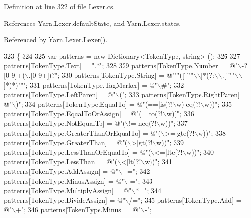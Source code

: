 Definition at line 322 of file Lexer.\-cs.



References Yarn.\-Lexer.\-default\-State, and Yarn.\-Lexer.\-states.



Referenced by Yarn.\-Lexer.\-Lexer().


\begin{DoxyCode}
323         \{
324 
325             var patterns = \textcolor{keyword}{new} Dictionary<TokenType, string> ();
326 
327             patterns[TokenType.Text] = \textcolor{stringliteral}{".*"};
328 
329             patterns[TokenType.Number] = \textcolor{stringliteral}{@"\(\backslash\)-?[0-9]+(\(\backslash\).[0-9+])?"};
330             patterns[TokenType.String] = \textcolor{stringliteral}{@"""([^""\(\backslash\)\(\backslash\)]*(?:\(\backslash\)\(\backslash\).[^""\(\backslash\)\(\backslash\)]*)*)"""};
331             patterns[TokenType.TagMarker] = \textcolor{stringliteral}{@"\(\backslash\)#"};
332             patterns[TokenType.LeftParen] = \textcolor{stringliteral}{@"\(\backslash\)("};
333             patterns[TokenType.RightParen] = \textcolor{stringliteral}{@"\(\backslash\))"};
334             patterns[TokenType.EqualTo] = \textcolor{stringliteral}{@"(==|is(?!\(\backslash\)w)|eq(?!\(\backslash\)w))"};
335             patterns[TokenType.EqualToOrAssign] = \textcolor{stringliteral}{@"(=|to(?!\(\backslash\)w))"};
336             patterns[TokenType.NotEqualTo] = \textcolor{stringliteral}{@"(\(\backslash\)!=|neq(?!\(\backslash\)w))"};
337             patterns[TokenType.GreaterThanOrEqualTo] = \textcolor{stringliteral}{@"(\(\backslash\)>=|gte(?!\(\backslash\)w))"};
338             patterns[TokenType.GreaterThan] = \textcolor{stringliteral}{@"(\(\backslash\)>|gt(?!\(\backslash\)w))"};
339             patterns[TokenType.LessThanOrEqualTo] = \textcolor{stringliteral}{@"(\(\backslash\)<=|lte(?!\(\backslash\)w))"};
340             patterns[TokenType.LessThan] = \textcolor{stringliteral}{@"(\(\backslash\)<|lt(?!\(\backslash\)w))"};
341             patterns[TokenType.AddAssign] = \textcolor{stringliteral}{@"\(\backslash\)+="};
342             patterns[TokenType.MinusAssign] = \textcolor{stringliteral}{@"\(\backslash\)-="};
343             patterns[TokenType.MultiplyAssign] = \textcolor{stringliteral}{@"\(\backslash\)*="};
344             patterns[TokenType.DivideAssign] = \textcolor{stringliteral}{@"\(\backslash\)/="};
345             patterns[TokenType.Add] = \textcolor{stringliteral}{@"\(\backslash\)+"};
346             patterns[TokenType.Minus] = \textcolor{stringliteral}{@"\(\backslash\)-"};

\end{DoxyCode}
